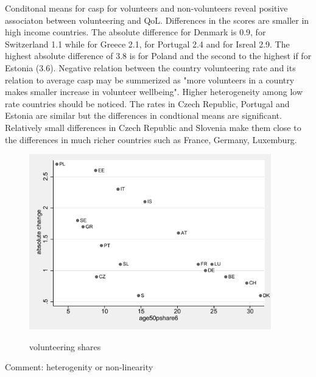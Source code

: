 \documentclass[10pt, letterpaper]{article}
\begin{document}
\begin{spacing}{1.4}
\begin{spacing}{.9}
\centering 
\begin{scriptsize} 
	 
      \label{CaspTtest} 
\end{scriptsize}
\end{spacing}


Conditonal means for casp for volunteers and non-volunteers reveal positive associaton between volunteering and QoL.  Differences in the scores are smaller in high income countries. The absolute difference for Denmark  is 0.9, for Switzerland 1.1 while for Greece 2.1, for Portugal 2.4 and for Isreal 2.9. The highest absolute difference of 3.8 is for Poland and the second to the highest if for Estonia (3.6). Negative relation between the country volunteering rate and its relation to average casp may be summerized as "more volunteers in a country makes smaller increase in volunteer wellbeing". Higher heterogeneity among low rate countries should be noticed. The rates in Czech Republic, Portugal and Estonia are similar but the differences in condtional means are significant. Relatively small differences in Czech Republic and Slovenia make them close to the differences in much richer countries such as France, Germany, Luxemburg. \\

\begin{figure}[H]
 \includegraphics[height=3in]{abs_casp.pdf}
 \centering
 \label{fig:oecd_50p}
\caption{volunteering shares}
\end{figure}


Comment: heterogenity or non-linearity  




\end{spacing}
\end{document}
